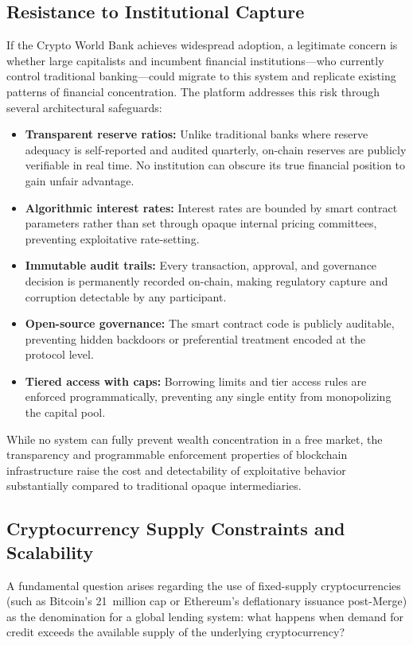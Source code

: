 \documentclass[12pt,a4paper]{report}
\begin{document}
\subsection{Resistance to Institutional Capture}

If the Crypto World Bank achieves widespread adoption, a legitimate concern is whether large capitalists and incumbent financial institutions---who currently control traditional banking---could migrate to this system and replicate existing patterns of financial concentration. The platform addresses this risk through several architectural safeguards:

\begin{itemize}[noitemsep]
\item \textbf{Transparent reserve ratios:} Unlike traditional banks where reserve adequacy is self-reported and audited quarterly, on-chain reserves are publicly verifiable in real time. No institution can obscure its true financial position to gain unfair advantage.
\item \textbf{Algorithmic interest rates:} Interest rates are bounded by smart contract parameters rather than set through opaque internal pricing committees, preventing exploitative rate-setting.
\item \textbf{Immutable audit trails:} Every transaction, approval, and governance decision is permanently recorded on-chain, making regulatory capture and corruption detectable by any participant.
\item \textbf{Open-source governance:} The smart contract code is publicly auditable, preventing hidden backdoors or preferential treatment encoded at the protocol level.
\item \textbf{Tiered access with caps:} Borrowing limits and tier access rules are enforced programmatically, preventing any single entity from monopolizing the capital pool.
\end{itemize}

While no system can fully prevent wealth concentration in a free market, the transparency and programmable enforcement properties of blockchain infrastructure raise the cost and detectability of exploitative behavior substantially compared to traditional opaque intermediaries.

\subsection{Cryptocurrency Supply Constraints and Scalability}

A fundamental question arises regarding the use of fixed-supply cryptocurrencies (such as Bitcoin's 21~million cap or Ethereum's deflationary issuance post-Merge) as the denomination for a global lending system: what happens when demand for credit exceeds the available supply of the underlying cryptocurrency?
\end{document}
